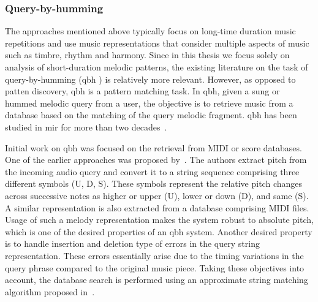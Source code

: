 


 


\subsubsection{Query-by-humming}
\label{sec:query_by_humming}

The approaches mentioned above typically focus on long-time duration music repetitions  and use music representations that consider multiple aspects of music such as timbre, rhythm and harmony. Since in this thesis we focus solely on analysis of short-duration melodic patterns, the existing literature on the task of query-by-humming (\gls{qbh} ) is relatively more relevant. However, as opposed to patten discovery, \gls{qbh}  is a pattern matching task. In \gls{qbh}, given a sung or hummed melodic query from a user, the objective is to retrieve music from a database based on the matching of the query melodic fragment. \gls{qbh}  has been studied in \gls{mir} for more than two decades~\cite{ghias1995query,McNab1996}.

Initial work on \gls{qbh}  was focused on the retrieval from MIDI or score databases. One of the earlier approaches was proposed by~\cite{ghias1995query}. The authors extract pitch from the incoming audio query and convert it to a string sequence comprising three different symbols (U, D, S). These symbols represent the relative pitch changes across successive notes as higher or upper (U), lower or down (D), and same (S). A similar representation is also extracted from a database comprising MIDI files. Usage of such a melody representation makes the system robust to absolute pitch, which is one of the desired properties of an \gls{qbh} system. Another desired property is to handle insertion and deletion type of errors in the query string representation. These errors essentially arise due to the timing variations in the query phrase compared to the original music piece. Taking these objectives into account, the database search is performed using an approximate string matching algorithm proposed in~\cite{baeza1992fast}.

